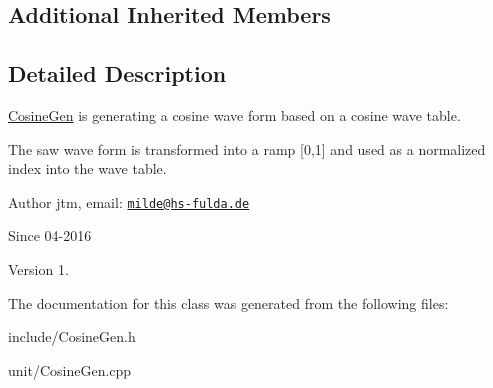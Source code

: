 \subsection*{Additional Inherited Members}


\subsection{Detailed Description}
\hyperlink{classunit_1_1CosineGen}{Cosine\-Gen} is generating a cosine wave form based on a cosine wave table.

The saw wave form is transformed into a ramp \mbox{[}0,1\mbox{]} and used as a normalized index into the wave table.

\begin{DoxyAuthor}{Author}
jtm, email\-:  \href{mailto:milde@hs-fulda.de}{\tt milde@hs-\/fulda.\-de} 
\end{DoxyAuthor}
\begin{DoxySince}{Since}
04-\/2016 
\end{DoxySince}
\begin{DoxyVersion}{Version}
1. 
\end{DoxyVersion}


The documentation for this class was generated from the following files\-:\begin{DoxyCompactItemize}
\item 
include/Cosine\-Gen.\-h\item 
unit/Cosine\-Gen.\-cpp\end{DoxyCompactItemize}
